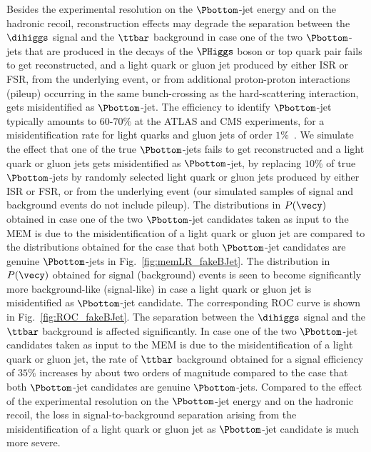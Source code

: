 Besides the experimental resolution on the $\Pbottom$-jet energy and on the hadronic recoil,
reconstruction effects may degrade the separation between the $\dihiggs$ signal and the $\ttbar$ background
in case one of the two $\Pbottom$-jets that are produced in the decays of the $\PHiggs$ boson or top quark pair
fails to get reconstructed,
and a light quark or gluon jet produced by either ISR or FSR, from the underlying event, 
or from additional proton-proton interactions (pileup) occurring in the same bunch-crossing as the hard-scattering interaction,
gets misidentified as $\Pbottom$-jet.
The efficiency to identify $\Pbottom$-jet typically amounts to $60$-$70\%$ at the ATLAS and CMS experiments,
for a misidentification rate for light quarks and gluon jets of order $1\%$~\cite{Aad:2015ydr,BTV-16-002}.
We simulate the effect that one of the true $\Pbottom$-jets fails to get reconstructed and a light quark or gluon jets gets misidentified as $\Pbottom$-jet,
by replacing $10\%$ of true $\Pbottom$-jets by randomly selected light quark or gluon jets produced by either ISR or FSR, or from the underlying event 
(our simulated samples of signal and background events do not include pileup).
The distributions in $P(\vecy)$ obtained in case one of the two $\Pbottom$-jet candidates taken as input to the MEM 
is due to the misidentification of a light quark or gluon jet 
are compared to the distributions obtained for the case that both $\Pbottom$-jet candidates are genuine $\Pbottom$-jets in Fig.~\ref{fig:memLR_fakeBJet}.
The distribution in $P(\vecy)$ obtained for signal (background) events is seen to become significantly more background-like (signal-like) 
in case a light quark or gluon jet is misidentified as $\Pbottom$-jet candidate.
The corresponding ROC curve is shown in Fig.~\ref{fig:ROC_fakeBJet}.
The separation between the $\dihiggs$ signal and the $\ttbar$ background is affected significantly.
In case one of the two $\Pbottom$-jet candidates taken as input to the MEM is due to the misidentification of a light quark or gluon jet,
the rate of $\ttbar$ background obtained for a signal efficiency of $35\%$ increases by about two orders of magnitude 
compared to the case that both $\Pbottom$-jet candidates are genuine $\Pbottom$-jets.
Compared to the effect of the experimental resolution on the $\Pbottom$-jet energy and on the hadronic recoil,
the loss in signal-to-background separation arising from the misidentification of a light quark or gluon jet as $\Pbottom$-jet candidate
is much more severe.

